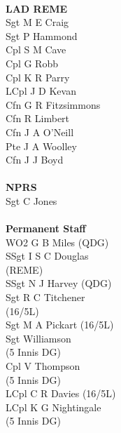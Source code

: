 \begin{multicols}{4}
  \\
  \textbf{LAD REME} \\
  Sgt M E Craig \\
  Sgt P Hammond \\
  Cpl S M Cave \\
  Cpl G Robb \\
  Cpl K R Parry \\
  LCpl J D Kevan \\
  Cfn G R Fitzsimmons \\
  Cfn R Limbert \\
  Cfn J A O'Neill \\
  Pte J A Woolley \\
  Cfn J J Boyd \\
  \\
  \textbf{NPRS} \\
  Sgt C Jones \\
  \\
  \textbf{Permanent Staff} \\
  WO2 G B Miles (QDG) \\
  SSgt I S C Douglas \\ \indent (REME) \\
  SSgt N J Harvey (QDG) \\
  Sgt R C Titchener \\ \indent (16/5L) \\
  Sgt M A Pickart (16/5L) \\
  Sgt Williamson \\ \indent (5 Innis DG) \\
  Cpl V Thompson \\ \indent (5 Innis DG) \\
  LCpl C R Davies (16/5L) \\
  LCpl K G Nightingale \\ \indent (5 Innis DG)
\end{multicols}

\pagebreak

